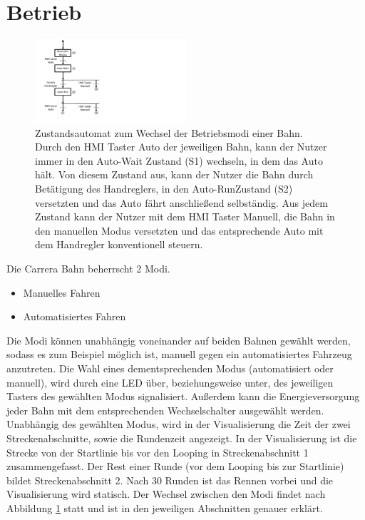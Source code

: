 \documentclass[a4paper, 11pt]{report}
\begin{document}
\section{Betrieb}
	\begin{figure}[ht]
		\centering
		\includegraphics[width=0.5\textwidth]{rec/modiAuswahl.pdf}
		\caption[Zustandsautomat zum Wechsel der Betriebsmodi einer Bahn]{Zustandsautomat zum Wechsel der Betriebsmodi einer Bahn.\\Durch den \glqq HMI Taster Auto\grqq{} der jeweiligen Bahn, kann der Nutzer immer in den \glqq Auto-Wait\grqq{} Zustand (S1) wechseln, in dem das Auto hält. Von diesem Zustand aus, kann der Nutzer die Bahn durch Betätigung des Handreglers, in den \glqq Auto-Run\grqq Zustand{} (S2) versetzten und das Auto fährt anschließend selbständig. Aus jedem Zustand kann der Nutzer mit dem \glqq HMI Taster Manuell\grqq{}, die Bahn in den manuellen Modus versetzten und das entsprechende Auto mit dem Handregler konventionell steuern.}
		\label{img:Betriebsmodi}
	\end{figure}
	Die Carrera Bahn beherrscht 2 Modi.
	\begin{itemize}
		\item Manuelles Fahren
		\item Automatisiertes Fahren
	\end{itemize}
	Die Modi können unabhängig voneinander auf beiden Bahnen gewählt werden, sodass es zum Beispiel möglich ist, manuell gegen ein automatisiertes Fahrzeug anzutreten. Die Wahl eines dementsprechenden Modus (automatisiert oder manuell), wird durch eine LED über, beziehungsweise unter, des jeweiligen Tasters des gewählten Modus signalisiert. Außerdem kann die Energieversorgung jeder Bahn mit dem entsprechenden Wechselschalter ausgewählt werden. Unabhängig des gewählten Modus, wird in der Visualisierung die Zeit der zwei Streckenabschnitte, sowie die Rundenzeit angezeigt.
In der Visualisierung ist die Strecke von der Startlinie bis vor den Looping in Streckenabschnitt 1 zusammengefasst.
			Der Rest einer Runde (vor dem Looping bis zur Startlinie) bildet Streckenabschnitt 2.
Nach 30 Runden ist das Rennen vorbei und die Visualisierung wird statisch.
	Der Wechsel zwischen den Modi findet nach Abbildung \ref{img:Betriebsmodi} statt und ist in den jeweiligen Abschnitten genauer erklärt.
\end{document}
